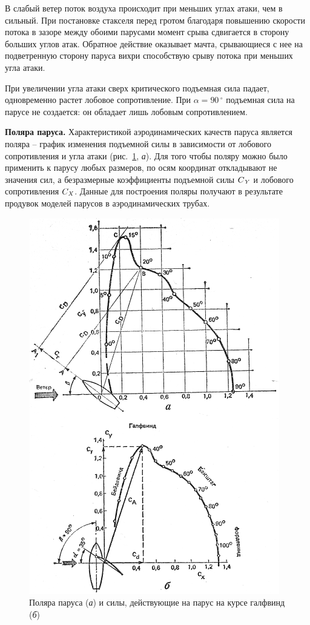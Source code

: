 \documentclass[a4paper, 12pt, twoside, final, book, russian, fittopage, cyremdash]{ncc}
\newcommand{\mcyr}[1]{\ensuremath{\text{\textit{#1}}}}
\newcommand{\cidx}[2]{\ensuremath{#1_{\mcyr{#2}}}}
\newcommand{\gr}{\ensuremath{\,^\circ}\xspace}
\newcommand{\ris}[1]{\ref{fig:#1}}
\begin{document}
В слабый ветер поток воздуха происходит при меньших углах атаки, чем в сильный. При постановке стакселя перед гротом благодаря повышению скорости потока в зазоре между обоими парусами момент срыва сдвигается в сторону больших углов атак. Обратное действие оказывает мачта, срывающиеся с нее на подветренную сторону паруса вихри способствую срыву потока при меньших угла атаки. 

При увеличении угла атаки сверх критического подъемная сила падает, одновременно растет лобовое сопротивление. При $\alpha = 90\gr$ подъемная сила на парусе не создается: он обладает лишь лобовым сопротивлением.

\textbf{Поляра паруса.} Характеристикой аэродинамических качеств паруса является поляра \--- график изменения подъемной силы в зависимости от лобового сопротивления и угла атаки (рис.~\ris{24}, \textit{а}). Для того чтобы поляру можно было применить к парусу любых размеров, по осям координат откладывают не значения сил, а безразмерные коэффициенты подъемной силы \cidx{C}{Y} и лобового сопротивления \cidx{C}{X}. Данные для построения поляры получают в результате продувок моделей парусов в аэродинамических трубах. 

\begin{figure}[htb]
  \centering
  \includegraphics[scale=1.2]{0024P}
  \caption{Поляра паруса (\textit{а}) и силы, действующие на парус на курсе галфвинд (\textit{б})}
  \label{fig:24}
\end{figure}
\end{document}
